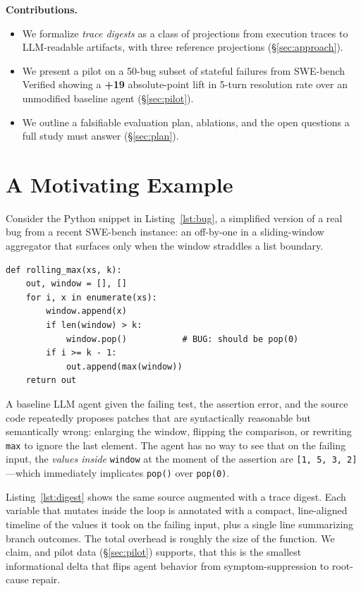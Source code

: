 \documentclass[sigconf,review,anonymous,nonacm]{acmart}
\begin{document}
\smallskip\noindent\textbf{Contributions.}
\begin{itemize}
\item We formalize \emph{trace digests} as a class of projections from
execution traces to LLM-readable artifacts, with three reference
projections (\S\ref{sec:approach}).
\item We present a pilot on a 50-bug subset of stateful failures from
SWE-bench Verified showing a \textbf{+19} absolute-point lift in 5-turn
resolution rate over an unmodified baseline agent (\S\ref{sec:pilot}).
\item We outline a falsifiable evaluation plan, ablations, and the open
questions a full study must answer (\S\ref{sec:plan}).
\end{itemize}

\section{A Motivating Example}
\label{sec:motivation}

Consider the Python snippet in Listing~\ref{lst:bug}, a simplified version
of a real bug from a recent SWE-bench instance: an off-by-one in a
sliding-window aggregator that surfaces only when the window straddles a
list boundary.

\begin{lstlisting}[caption={A stateful bug. The failing test asserts
\texttt{rolling\_max([1,5,3,2,8],\,k=3)\,==\,[5,5,8]}.},label={lst:bug}]
def rolling_max(xs, k):
    out, window = [], []
    for i, x in enumerate(xs):
        window.append(x)
        if len(window) > k:
            window.pop()           # BUG: should be pop(0)
        if i >= k - 1:
            out.append(max(window))
    return out
\end{lstlisting}

A baseline LLM agent given the failing test, the assertion error, and the
source code repeatedly proposes patches that are syntactically reasonable
but semantically wrong: enlarging the window, flipping the comparison, or
rewriting \verb|max| to ignore the last element. The agent has no way to
see that on the failing input, the \emph{values inside} \verb|window| at
the moment of the assertion are \verb|[1, 5, 3, 2]|---which immediately
implicates \verb|pop()| over \verb|pop(0)|.

Listing~\ref{lst:digest} shows the same source augmented with a trace
digest. Each variable that mutates inside the loop is annotated with a
compact, line-aligned timeline of the values it took on the failing input,
plus a single line summarizing branch outcomes. The total overhead is
roughly the size of the function. We claim, and pilot data
(\S\ref{sec:pilot}) supports, that this is the smallest informational delta
that flips agent behavior from symptom-suppression to root-cause repair.
\end{document}
